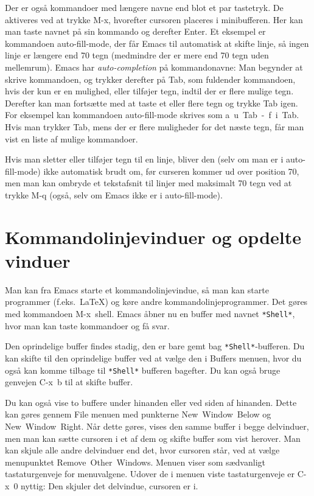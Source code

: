 \documentclass[a4paper]{article}
\begin{document}
Der er også kommandoer med længere navne end blot et par tastetryk.
De aktiveres ved at trykke \textsf{M-x}, hvorefter cursoren placeres i
minibufferen.  Her kan man taste navnet på sin kommando og derefter
\textsf{Enter}.  Et eksempel er kommandoen \textsf{auto-fill-mode},
der får Emacs til automatisk at skifte linje, så ingen linje er
længere end 70 tegn (medmindre der er mere end 70 tegn uden
mellemrum).  Emacs har \emph{auto-completion} på kommandonavne: Man
begynder at skrive kommandoen, og trykker derefter på \textsf{Tab},
som fuldender kommandoen, hvis der kun er en mulighed, eller tilføjer
tegn, indtil der er flere mulige tegn.  Derefter kan man fortsætte med
at taste et eller flere tegn og trykke \textsf{Tab} igen.  For
eksempel kan kommandoen \textsf{auto-fill-mode} skrives som
\textsf{a~u~Tab~-~f~i~Tab}.  Hvis man trykker \textsf{Tab}, mens der er
flere muligheder for det næste tegn, får man vist en liste af mulige
kommandoer.

Hvis man sletter eller tilføjer tegn til en linje, bliver den (selv om
man er i auto-fill-mode) ikke automatisk brudt om, før curseren kommer
ud over position 70, men man kan ombryde et tekstafsnit til linjer med
maksimalt 70 tegn ved at trykke \textsf{M-q} (også, selv om Emacs ikke
er i auto-fill-mode).

\section{Kommandolinjevinduer og opdelte vinduer}

Man kan fra Emacs starte et kommandolinjevindue, så man kan starte
programmer (f.eks.\ \LaTeX) og køre andre kommandolinjeprogrammer.
Det gøres med kommandoen \textsf{M-x~shell}.  Emacs åbner nu en buffer
med navnet \texttt{*Shell*}, hvor man kan taste kommandoer og få svar.

Den oprindelige buffer findes stadig, den er bare gemt bag
\texttt{*Shell*}-bufferen. Du kan skifte til den oprindelige buffer
ved at vælge den i \textsf{Buffers} menuen, hvor du også kan komme
tilbage til \texttt{*Shell*} bufferen bagefter.  Du kan også bruge
genvejen \textsf{C-x~b} til at skifte buffer.

Du kan også vise to buffere under hinanden eller ved siden af
hinanden.  Dette kan gøres gennem \textsf{File} menuen med punkterne
\textsf{New~Window~Below} og \textsf{New~Window~Right}.  Når dette
gøres, vises den samme buffer i begge delvinduer, men man kan sætte
cursoren i et af dem og skifte buffer som vist herover.  Man kan skjule
alle andre delvinduer end det, hvor cursoren står, ved at vælge
menupunktet \textsf{Remove~Other~Windows}.  Menuen viser som
sædvanligt tastaturgenveje for menu\-valgene. Udover de i menuen viste
tastaturgenveje er \textsf{C-x~0} nyttig: Den skjuler det delvindue,
cursoren er i.
\end{document}
